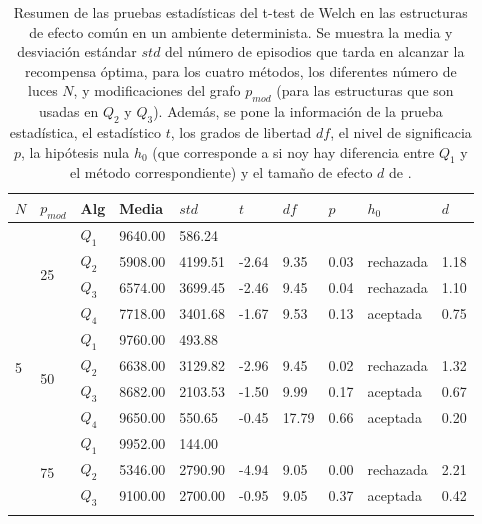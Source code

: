 \clearpage

\begin{table}[]
\centering
\caption{Resumen de las pruebas estadísticas del t-test de Welch en las
estructuras de efecto común en un ambiente determinista. Se muestra la media y desviación estándar $std$ del número 
de episodios que tarda en alcanzar la recompensa óptima, para los cuatro métodos, los diferentes número de luces $N$, y modificaciones del grafo $p_{mod}$ (para las estructuras que son usadas en $Q_2$ y $Q_3$). Además, se pone la información
de la prueba estadística, el estadístico $t$, los grados de libertad $df$, el nivel
de significacia $p$, la hipótesis nula $h_0$ (que corresponde a si noy hay diferencia entre $Q_1$ y el método correspondiente) y el tamaño de efecto $d$ de \citet{cohen2013statistical}.}
\label{tab:common-effect-pmod-det}
\begin{tabular}{|l|l|l|l|l|l|l|l|l|l|}
\hline
$N$ & $p_{mod}$ & Alg & Media & $std$ & $t$ & $df$ & $p$ & $h_0$ & $d$ \\ \hline
\multirow{12}{*}{5} & \multirow{4}{*}{25} & $Q_1$ & 9640.00 & 586.24 & \multicolumn{5}{l|}{} \\ \cline{3-10} 
 &  & $Q_2$ & 5908.00 & 4199.51 & -2.64 & 9.35 & 0.03 & rechazada & 1.18 \\ \cline{3-10} 
 &  & $Q_3$ & 6574.00 & 3699.45 & -2.46 & 9.45 & 0.04 & rechazada & 1.10 \\ \cline{3-10} 
 &  & $Q_4$ & 7718.00 & 3401.68 & -1.67 & 9.53 & 0.13 & aceptada & 0.75 \\ \cline{2-10} 
 & \multirow{4}{*}{50} & $Q_1$ & 9760.00 & 493.88 & \multicolumn{5}{l|}{} \\ \cline{3-10} 
 &  & $Q_2$ & 6638.00 & 3129.82 & -2.96 & 9.45 & 0.02 & rechazada & 1.32 \\ \cline{3-10} 
 &  & $Q_3$ & 8682.00 & 2103.53 & -1.50 & 9.99 & 0.17 & aceptada & 0.67 \\ \cline{3-10} 
 &  & $Q_4$ & 9650.00 & 550.65 & -0.45 & 17.79 & 0.66 & aceptada & 0.20 \\ \cline{2-10} 
 & \multirow{4}{*}{75} & $Q_1$ & 9952.00 & 144.00 & \multicolumn{5}{l|}{} \\ \cline{3-10} 
 &  & $Q_2$ & 5346.00 & 2790.90 & -4.94 & 9.05 & 0.00 & rechazada & 2.21 \\ \cline{3-10} 
 &  & $Q_3$ & 9100.00 & 2700.00 & -0.95 & 9.05 & 0.37 & aceptada & 0.42 \\ \cline{3-10} 

\end{tabular}
\end{table}
